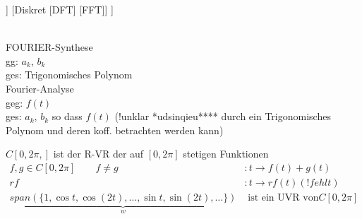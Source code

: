 	\begin{forest}
	[FOURIER-Theorie 
	[	kontinuierlich[Fourier-Reihen]  ]
	[Diskret [DFT] [FFT]]
	]
\end{forest}\\

\newpage
FOURIER-Synthese\\
gg: $a_k$, $b_k$\\
ges: Trigonomisches Polynom\\
Fourier-Analyse\\
geg: $f(t)$\\
ges: $a_k$, $b_k$ so dass $f(t)$ (!unklar *udsinqieu**** durch ein Trigonomisches Polynom und deren koff. betrachten werden kann)\\
\begin{remark}
$	C[0,2\pi,]$ ist der R-VR der auf $[0,2\pi]$ stetigen Funktionen \\

 \begin{align*}
f,g \in C[0,2\pi] \qquad f \neq g &: t \rightarrow f(t) + g(t)\\
r f &:t \rightarrow rf(t)  (!fehlt)\\
\underbrace{span( \{ 1,\cos t , \cos(2t),\dots,\sin t,\sin (2t),\dots   \}) }_{w}&\text{ ist ein UVR von} C[0,2\pi]
\end{align*}

\end{remark}
